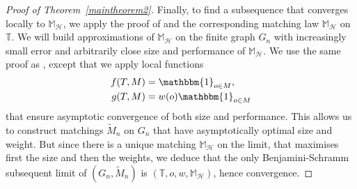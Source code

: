\documentclass[11pt]{article}
\begin{document}
\begin{proof}[Proof of Theorem~\ref{maintheorem2}]
Finally, to find a subsequence that converges locally to $\mathbb{M}_{\mathcal{H}}$, we apply the proof of \cite[Section~4]{enriquez2024optimalunimodularmatching}  and the corresponding matching law $\mathbb{M}_{\mathcal{H}}$ on $\mathbb{T}$. We will build approximations of $\mathbb{M}_{\mathcal{H}}$ on the finite graph $G_{n}$ with increasingly small error and arbitrarily close size and performance of $\mathbb{M}_{\mathcal{H}}$.
We use the same proof as \cite[Proposition~4.2]{enriquez2024optimalunimodularmatching}, except that we apply \cite[Proposition~4.10]{enriquez2024optimalunimodularmatching} local functions 
\begin{align*}
    f(T,M)&=\mathbbm{1}_{o \in M} ,\\
    g(T,M)&=w(o)\mathbbm{1}_{o \in M}
\end{align*}
that ensure asymptotic convergence of both size and performance.
This allows us to construct matchings $\tilde{M}_n$ on $G_n$ that have asymptotically optimal size and weight. But since there is a unique matching $\mathbb{M}_{\mathcal{H}}$ on the limit, that maximises first the size and then the weights, we deduce that the only Benjamini-Schramm subsequent limit of $(G_n,\tilde{M}_n)$ is $(\mathbb{T},o,w,\mathbb{M}_{\mathcal{H}})$, hence convergence.
\end{proof}
\end{document}
